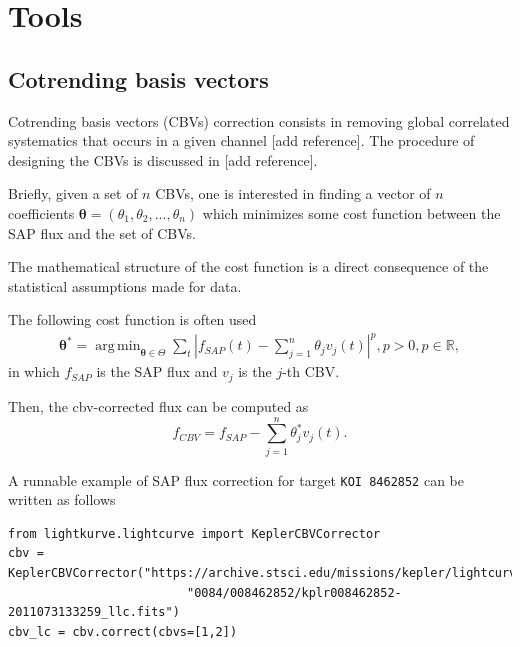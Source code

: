 \documentclass{article}
\DeclareMathOperator*{\argmin}{arg\,min}
\begin{document}
\section{Tools}

\subsection{Cotrending basis vectors}

Cotrending basis vectors (CBVs) correction consists in removing global correlated
systematics that occurs in a given channel [add reference]. The procedure of
designing the CBVs is discussed in [add reference].

Briefly, given a set of $n$ CBVs, one is interested in finding a vector of $n$
coefficients $\bm{\theta}=(\theta_1, \theta_2, ..., \theta_n)$ which minimizes
some cost function between the SAP flux and the set of CBVs.

The mathematical structure of the cost function is a direct consequence of
the statistical assumptions made for data.

The following cost function is often used
\begin{align}
    \bm{\theta}^{*} = \argmin_{\bm{\theta} \in \Theta} \sum_{t}|f_{SAP}(t)
    - \sum_{j=1}^{n}\theta_j v_{j}(t)|^p, p>0, p \in \mathbb{R},
\end{align}
in which $f_{SAP}$ is the SAP flux and $v_j$ is the $j$-th CBV.

Then, the cbv-corrected flux can be computed as
\begin{equation}
    f_{CBV} = f_{SAP} - \sum_{j=1}^{n}\theta^{*}_j v_{j}(t).
\end{equation}

A runnable example of SAP flux correction for target \texttt{KOI 8462852}
can be written as follows
\begin{verbatim}
from lightkurve.lightcurve import KeplerCBVCorrector
cbv = KeplerCBVCorrector("https://archive.stsci.edu/missions/kepler/lightcurves/"
                         "0084/008462852/kplr008462852-2011073133259_llc.fits")
cbv_lc = cbv.correct(cbvs=[1,2])
\end{verbatim}
\end{document}

